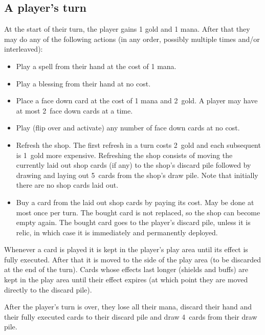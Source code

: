 \documentclass[dvipsnames,parskip,a4paper]{scrartcl}
\newcommand{\facedowncost}{2}
\newcommand{\refreshcost}{2}
\newcommand{\refreshcostincrease}{1}
\newcommand{\handsize}{4}
\newcommand{\dacedownsize}{2}
\newcommand{\shopsize}{5}
\begin{document}
\subsection*{A player's turn}

At the start of their turn, the player gains 1 gold and 1 mana. After that they may do any of the following actions (in any order, possibly multiple times and/or interleaved):

\begin{itemize}
\item Play a spell from their hand at the cost of 1 mana.
\item Play a blessing from their hand at no cost.
\item Place a face down card at the cost of 1 mana and \facedowncost \ gold. A player may have at most \dacedownsize \ face down cards at a time.
\item Play (flip over and activate) any number of face down cards at no cost.
\item Refresh the shop. The first refresh in a turn costs \refreshcost \ gold and each subsequent is \refreshcostincrease \ gold more expensive.
Refreshing the shop consists of moving the currently laid out shop cards (if any) to the shop's discard pile followed by drawing and laying out \shopsize \ cards from the shop's draw pile. Note that initially there are no shop cards laid out.
\item Buy a card from the laid out shop cards by paying its cost. May be done at most once per turn.
The bought card is not replaced, so the shop can become empty again. The bought card goes to the player's discard pile, unless it is relic, in which case it is immediately and permanently deployed.
\end{itemize}

Whenever a card is played it is kept in the player's play area until its effect is fully executed. After that it is moved to the side of the play area (to be discarded at the end of the turn). Cards whose effects last longer (shields and buffs) are kept in the play area until their effect expires (at which point they are moved directly to the discard pile).

\vspace{4pt}

After the player's turn is over, they lose all their mana, discard their hand and their fully executed cards to their discard pile and draw \handsize \ cards from their draw pile.

\newpage
\end{document}
